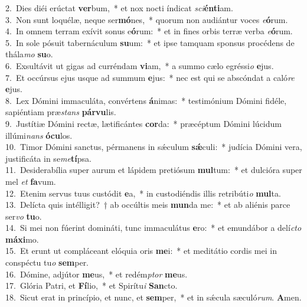 {2.~}Dies diéi erúctat \textbf{ver}bum,~* et nox nocti índicat \textit{sci}\textbf{én}\textbf{ti}am.\\
{3.~}Non sunt loquélæ, neque ser\textbf{mó}nes,~* quorum non audiántur voces \textit{e}\textbf{ó}rum.\\
{4.~}In omnem terram exívit sonus e\textbf{ó}rum:~* et in fines orbis terræ verba \textit{e}\textbf{ó}rum.\\
{5.~}In sole pósuit tabernáculum \textbf{su}um:~* et ipse tamquam sponsus procédens de thála\textit{mo} \textbf{su}o.\\
{6.~}Exsultávit ut gigas ad curréndam \textbf{vi}am,~* a summo cælo egréssi\textit{o} \textbf{e}jus.\\
{7.~}Et occúrsus ejus usque ad summum \textbf{e}jus:~* nec est qui se abscóndat a caló\textit{re} \textbf{e}jus.\\
{8.~}Lex Dómini immaculáta, convértens \textbf{á}nimas:~* testimónium Dómini fidéle, sapiéntiam præ\textit{stans} \textbf{pár}\textbf{vu}lis.\\
{9.~}Justítiæ Dómini rectæ, lætificántes \textbf{cor}da:~* præcéptum Dómini lúcidum illúmi\textit{nans} \textbf{ó}\textbf{cu}los.\\
{10.~}Timor Dómini sanctus, pérmanens in sǽculum \textbf{sǽ}culi:~* judícia Dómini vera, justificáta in se\textit{me}\textbf{tí}psa.\\
{11.~}Desiderabília super aurum et lápidem pretiósum \textbf{mul}tum:~* et dulcióra super mel \textit{et} \textbf{fa}vum.\\
{12.~}Etenim servus tuus custódit \textbf{e}a,~* in custodiéndis illis retribúti\textit{o} \textbf{mul}ta.\\
{13.~}Delícta quis intélligit?~† ab occúltis meis \textbf{mun}da me:~* et ab aliénis parce ser\textit{vo} \textbf{tu}o.\\
{14.~}Si mei non fúerint domináti, tunc immaculátus \textbf{e}ro:~* et emundábor a delí\textit{cto} \textbf{má}\textbf{xi}mo.\\
{15.~}Et erunt ut compláceant elóquia oris \textbf{me}i:~* et meditátio cordis mei in conspéctu tu\textit{o} \textbf{sem}per.\\
{16.~}Dómine, adjútor \textbf{me}us,~* et redém\textit{ptor} \textbf{me}us.\\
{17.~}Glória Patri, et \textbf{Fí}lio,~* et Spirítu\textit{i} \textbf{San}cto.\\
{18.~}Sicut erat in princípio, et nunc, et \textbf{sem}per,~* et in sǽcula sæculó\textit{rum}. \textbf{A}men.\\

